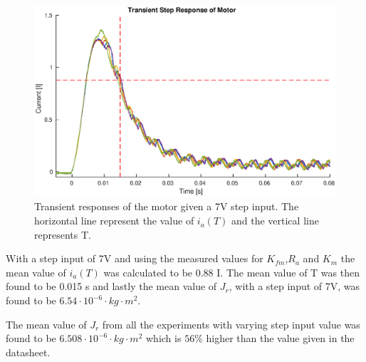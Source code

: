 \begin{figure}[!h]
	\centering
	\includegraphics[width=\linewidth]{graphics/transient_response_inertia}
	\caption{Transient responses of the motor given a 7V step input. The horizontal line represent the value of $i_a(T)$ and the vertical line represents T.}
	\label{fig:inertia_trans_plot}
\end{figure}

With a step input of 7V and using the measured values for $K_{fm}$,$R_a$ and $K_m$ the mean value of $i_a(T)$ was calculated to be 0.88 I. 
The mean value of T was then found to be 0.015 s and lastly the mean value of $J_r$, with a step input of 7V, was found to be $6.54 \cdot 10^{-6} \cdot kg \cdot m^2$.

\par
The mean value of $J_r$ from all the experiments with varying step input value was found to be $ 6.508 \cdot 10^{-6} \cdot kg \cdot m^2$ which is $56\%$ higher than the value given in the datasheet. 

